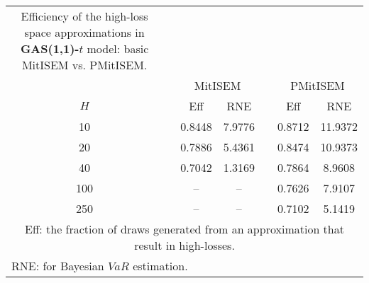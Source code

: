 { \renewcommand{\arraystretch}{1.2} 
\begin{longtable}{cc cc c cc} 
\caption{Efficiency of the high-loss space approximations in \textbf{GAS(1,1)-$t$} model:\\ basic MitISEM vs. PMitISEM.} 
\label{tab:efft_gas} \\ 
 && \multicolumn{2}{c}{MitISEM} && \multicolumn{2}{c}{PMitISEM} \\ \cline{3-4} \cline{6-7} 
 $H$ && Eff  & RNE && Eff & RNE  \\ \cline{1-1} \cline{3-4} \cline{6-7} 
10 & &0.8448 &  7.9776 && 0.8712 &  11.9372 \\ [1ex] 
20 & &0.7886 &  5.4361 && 0.8474 &  10.9373 \\ [1ex] 
40 & &0.7042 &  1.3169 && 0.7864 &  8.9608 \\ [1ex] 
100 & &-- & -- && 0.7626 &  7.9107 \\ [1ex] 
250 & &-- & -- && 0.7102 &  5.1419 \\ [1ex] 
\hline 
\multicolumn{7}{p{7cm}}{\footnotesize{Eff: the fraction of draws generated from an approximation that result in high-losses.}}  \\ 
\multicolumn{7}{l}{\footnotesize{RNE: for Bayesian $VaR$ estimation.}} 
\end{longtable} 
} 
